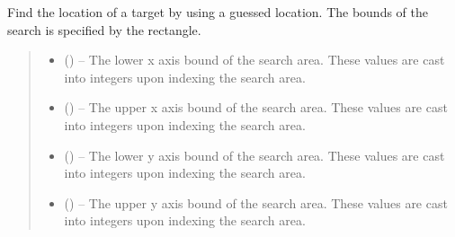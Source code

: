 \documentclass[letterpaper,11pt,english]{sphinxmanual}
\begin{document}
\begin{savenotes}
\begin{fulllineitems}

\begin{savenotes}\begin{fulllineitems}
\label{\detokenize{code/opihiexarata.gui.selector:opihiexarata.gui.selector.TargetSelectorWindow.find_target_location}}
\pysigstartsignatures
{}
\pysigstopsignatures
\sphinxAtStartPar
Find the location of a target by using a guessed location.
The bounds of the search is specified by the rectangle.
\begin{quote}\begin{description}
\begin{itemize}
\item {} 
\sphinxAtStartPar
{} () – The lower x axis bound of the search area. These values are cast
into integers upon indexing the search area.

\item {} 
\sphinxAtStartPar
{} () – The upper x axis bound of the search area. These values are cast
into integers upon indexing the search area.

\item {} 
\sphinxAtStartPar
{} () – The lower y axis bound of the search area. These values are cast
into integers upon indexing the search area.

\item {} 
\sphinxAtStartPar
{} () – The upper y axis bound of the search area. These values are cast
into integers upon indexing the search area.

\end{itemize}


\end{description}
\end{quote}
\end{fulllineitems}
\end{savenotes}
\end{fulllineitems}
\end{savenotes}
\end{document}

